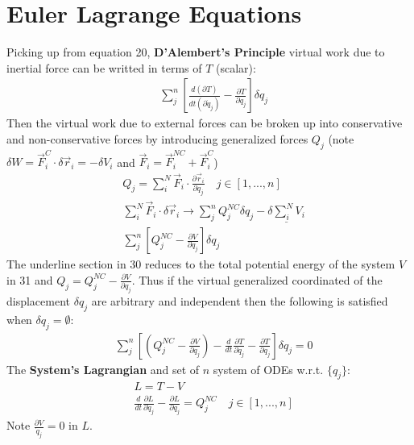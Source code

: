 \documentclass[conference]{IEEEtran}
\begin{document}
\section{Euler Lagrange Equations}
Picking up from equation 20, \textbf{D'Alembert's Principle} virtual work due to inertial force can be writted in terms of $T$ (scalar):
\begin{align}
    & \sum_j^n [\frac{d(\partial T)}{dt(\partial \dot{q}_j)} - \frac{\partial T}{\partial q_j}] \delta q_j
\end{align}
Then the virtual work due to external forces can be broken up into conservative and non-conservative forces by introducing generalized forces $Q_j$ (note $\delta W = \vec{F}_i^C \cdot \delta \vec{r}_i = -\delta V_i$ and $\vec{F}_i = \vec{F}_i^{NC} + \vec{F}_i^C$)
\begin{align}
    & Q_j = \sum_i^N \vec{F}_i \cdot \frac{\partial \vec{r}_i}{\partial q_j} \quad j \in [1, ..., n] \\
    & \sum_i^N \vec{F}_i \cdot \delta \vec{r}_i \to \sum_j^n Q_j^{NC} \delta q_j - \underline{\delta \sum_i^N V_i} \\
    & \sum_j^n[Q_j^{NC} - \frac{\partial V}{\partial q_j}]\delta q_j
\end{align}
The underline section in 30 reduces to the total potential energy of the system $V$ in 31 and $Q_j = Q_j^{NC} - \frac{\partial V}{\partial q_j}$. Thus if the virtual generalized coordinated of the displacement $\delta q_j$ are arbitrary and independent then the following is satisfied when $\delta q_j = \emptyset$:
\begin{align}
    & \sum_j^n [(Q_j^{NC} - \frac{\partial V}{\partial q_j}) - \frac{d}{dt}\frac{\partial T}{\partial \dot{q}_j} - \frac{\partial T}{\partial q_j}] \delta q_j = 0
\end{align}
The \textbf{System's Lagrangian} and set of $n$ system  of ODEs w.r.t. $\{q_j\}$:
\begin{align}
    & L = T - V \\
    & \frac{d}{dt}\frac{\partial L}{\partial \dot{q}_j} - \frac{\partial L}{\partial q_j} = Q_j^{NC} \quad j \in [1, ..., n]
\end{align}
Note $\frac{\partial V}{\dot{q}_j} = 0$ in $L$.
\end{document}
